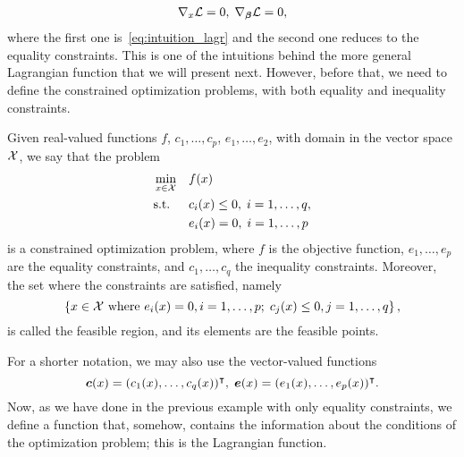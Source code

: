 \begin{equation}\nonumber
    \begin{aligned}
        \nabla_x {\mathcal{L}}= 0, \; \nabla_{\bm{\beta}} {\mathcal{L}}= 0,
    \end{aligned}
\end{equation}
where the first one is~\eqref{eq:intuition_lagr} and the second one reduces to the equality constraints.
This is one of the intuitions behind the more general Lagrangian function that we will present next. 
However, before that, we need to define the constrained optimization problems, with both equality and inequality constraints.
\begin{definition}
    Given real-valued functions $f$, $c_1, \ldots, c_p$, $e_1, \ldots, e_2$, with domain in the vector space $\mathcal{X}$,
    we say that the problem
    \begin{equation}\label{eq:optproblem_def}
        \begin{aligned}
            &\min_{x \in \vecspace} & & f(x) \\
            & \text{s.t.} & & c_i(x) \leq 0,\; i=1, \ldots, q , \\
            & & & e_i(x) = 0,\; i=1, \ldots, p              
        \end{aligned}
    \end{equation}
    is a constrained optimization problem, where $f$ is the objective function, $e_1, \ldots, e_p$ are the equality constraints, and $c_1, \ldots, c_q$ the inequality constraints.
    Moreover, the set where the constraints are satisfied, namely
    \begin{equation}
        \nonumber
        \left\{x \in \mathcal{X} \text{ where } e_i(x)=0, i=1, \ldots, p; \; c_j(x)\leq 0, j=1, \ldots, q\right\} ,
    \end{equation}
    is called the feasible region, and its elements are the feasible points.
\end{definition}
For a shorter notation, we may also use the vector-valued functions 
$$\bm{c}(x) = (c_1(x), \ldots, c_q(x))^\intercal, \; \bm{e}(x) = (e_1(x), \ldots, e_p(x))^\intercal .   $$
Now, as we have done in the previous example with only equality constraints, we define a function that, somehow, contains the information about the conditions of the optimization problem; this is the Lagrangian function.
